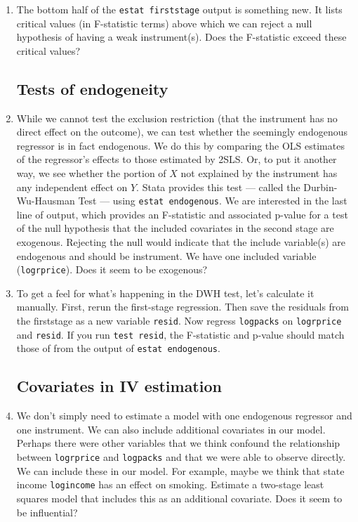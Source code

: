 \documentclass[a4paper,12pt]{article}
\begin{document}
\begin{enumerate}
\item The bottom half of the \texttt{estat firststage} output is something new. It lists critical values (in F-statistic terms) above which we can reject a null hypothesis of having a weak instrument(s). Does the F-statistic exceed these critical values?

\subsection*{Tests of endogeneity}

\item While we cannot test the exclusion restriction (that the instrument has no direct effect on the outcome), we can test whether the seemingly endogenous regressor is in fact endogenous. We do this by comparing the OLS estimates of the regressor's effects to those estimated by 2SLS. Or, to put it another way, we see whether the portion of $X$ not explained by the instrument has any independent effect on $Y$. Stata provides this test --- called the Durbin-Wu-Hausman Test --- using \texttt{estat endogenous}. We are interested in the last line of output, which provides an F-statistic and associated p-value for a test of the null hypothesis that the included covariates in the second stage are exogenous. Rejecting the null would indicate that the include variable(s) are endogenous and should be instrument. We have one included variable (\texttt{logrprice}). Does it seem to be exogenous?

\item To get a feel for what's happening in the DWH test, let's calculate it manually. First, rerun the first-stage regression. Then save the residuals from the firststage as a new variable \texttt{resid}. Now regress \texttt{logpacks} on \texttt{logrprice} and \texttt{resid}. If you run \texttt{test resid}, the F-statistic and p-value should match those of from the output of \texttt{estat endogenous}.


\subsection*{Covariates in IV estimation}

\item We don't simply need to estimate a model with one endogenous regressor and one instrument. We can also include additional covariates in our model. Perhaps there were other variables that we think confound the relationship between \texttt{logrprice} and \texttt{logpacks} and that we were able to observe directly. We can include these in our model. For example, maybe we think that state income \texttt{logincome} has an effect on smoking. Estimate a two-stage least squares model that includes this as an additional covariate. Does it seem to be influential?


\end{enumerate}
\end{document}
